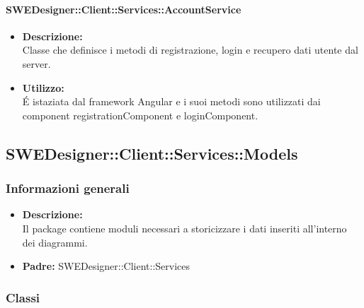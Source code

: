           	\paragraph{SWEDesigner::Client::Services::AccountService}
				\begin{itemize}
          			\item \textbf{Descrizione:}\\
          			Classe che definisce i metodi di registrazione, login e recupero dati utente dal server.
          			\item \textbf{Utilizzo:}\\
          			É istaziata dal framework Angular e i suoi metodi sono utilizzati dai component registrationComponent e loginComponent.
          		\end{itemize}
	\subsection{SWEDesigner::Client::Services::Models}
		\subsubsection{Informazioni generali}
			\begin{itemize}
          		\item \textbf{Descrizione:}\\
          		Il package contiene moduli necessari a storicizzare i dati inseriti all’interno
dei diagrammi.
          		\item \textbf{Padre:} SWEDesigner::Client::Services
          	\end{itemize}
		\subsubsection{Classi}
